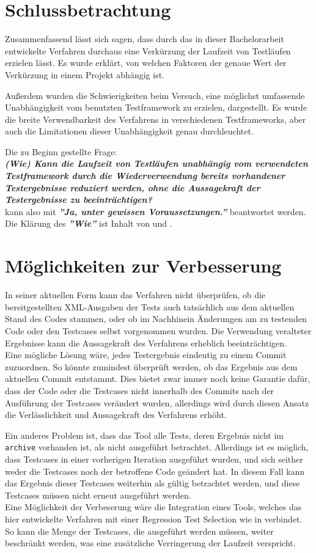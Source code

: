 \section{Schlussbetrachtung}
Zusammenfassend lässt sich sagen, dass durch das in dieser Bachelorarbeit entwickelte Verfahren durchaus eine Verkürzung der Laufzeit von Testläufen erzielen lässt. Es wurde erklärt, von welchen Faktoren der genaue Wert der Verkürzung in einem Projekt abhängig ist. 

Außerdem wurden die Schwierigkeiten beim Versuch, eine möglichst umfassende Unabhängigkeit vom benutzten Testframework zu erzielen, dargestellt. Es wurde die breite Verwendbarkeit des Verfahrens in verschiedenen Testframeworks, aber auch die Limitationen dieser Unabhängigkeit genau durchleuchtet. 

Die zu Beginn gestellte Frage:\\
\textit{\textbf{(Wie) Kann die Laufzeit von Testläufen unabhängig vom verwendeten Testframework durch die Wiederverwendung bereits vorhandener Testergebnisse reduziert werden, ohne die Aussagekraft der Testergebnisse zu beeinträchtigen?}}\\
kann also mit \textit{\textbf{''Ja, unter gewissen Voraussetzungen.''}} beantwortet werden. Die Klärung des \textit{\textbf{''Wie''}} ist Inhalt von  und . 

\section{Möglichkeiten zur Verbesserung}
In seiner aktuellen Form kann das Verfahren nicht überprüfen, ob die bereitgestellten XML-Ausgaben der Tests auch tatsächlich aus dem aktuellen Stand des Codes stammen, oder ob im Nachhinein Änderungen am zu testenden Code oder den Testcases selbst vorgenommen wurden. Die Verwendung veralteter Ergebnisse kann die Aussagekraft des Verfahrens erheblich beeinträchtigen.\\
Eine mögliche Lösung wäre, jedes Testergebnis eindeutig zu einem Commit zuzuordnen. So könnte zumindest überprüft werden, ob das Ergebnis aus dem aktuellen Commit entstammt. Dies bietet zwar immer noch keine Garantie dafür, dass der Code oder die Testcases nicht innerhalb des Commits nach der Ausführung der Testcases verändert wurden, allerdings wird durch diesen Ansatz die Verlässlichkeit und Aussagekraft des Verfahrens erhöht.

Ein anderes Problem ist, dass das Tool alle Tests, deren Ergebnis nicht im \texttt{archive} vorhanden ist, als nicht ausgeführt betrachtet. Allerdings ist es möglich, dass Testcases in einer vorherigen Iteration ausgeführt wurden, und sich seither weder die Testcases noch der betroffene Code geändert hat. In diesem Fall kann das Ergebnis dieser Testcases weiterhin als gültig betrachtet werden, und diese Testcases müssen nicht erneut ausgeführt werden.\\
Eine Möglichkeit der Verbeserung wäre die Integration eines Tools, welches das hier entwickelte Verfahren mit einer Regression Test Selection wie in  verbindet. So kann die Menge der Testcases, die ausgeführt werden müssen, weiter beschränkt werden, was eine zusätzliche Verringerung der Laufzeit verspricht.

